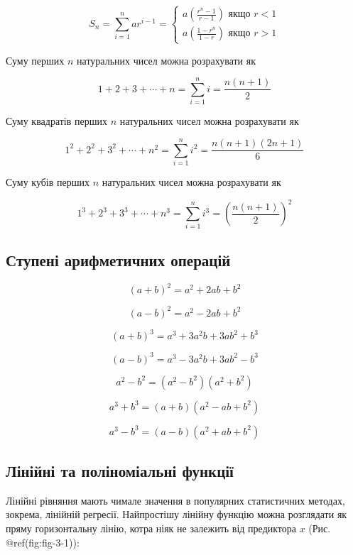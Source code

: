 \documentclass[
  11pt,
]{book}
\begin{document}
\[S_n = \sum\limits_{i=1}^n ar^{i-1} = \begin{cases}
a \left( \frac{r^n - 1}{r-1} \right) \text{ якщо } r<1 \\
a \left( \frac{1-r^n}{1-r} \right) \text{ якщо } r>1
\end{cases}\]

Суму перших \(n\) натуральних чисел можна розрахувати як

\[1+2+3+\cdots + n = \sum\limits_{i=1}^n i = \frac{n(n+1)}{2}\]

Суму квадратів перших \(n\) натуральних чисел можна розрахувати як

\[1^2+2^2+3^2+\cdots + n^2 = \sum\limits_{i=1}^n i^2 = \frac{n(n+1)(2n+1)}{6}\]

Суму кубів перших \(n\) натуральних чисел можна розрахувати як

\[1^3+2^3+3^3+\cdots + n^3 = \sum\limits_{i=1}^n i^3 = \left( \frac{n(n+1)}{2} \right)^2\]

\subsection{Ступені арифметичних
операцій}\label{ux441ux442ux443ux43fux435ux43dux456-ux430ux440ux438ux444ux43cux435ux442ux438ux447ux43dux438ux445-ux43eux43fux435ux440ux430ux446ux456ux439}

\[(a+b)^2 = a^2 + 2ab + b^2\]

\[(a-b)^2 = a^2 - 2ab + b^2\]

\[(a+b)^3 = a^3 + 3a^2b + 3ab^2 + b^3\]

\[(a-b)^3 = a^3 - 3a^2b + 3ab^2 - b^3\]

\[a^2 - b^2 = (a^2 - b^2)(a^2 + b^2)\]

\[a^3 + b^3 = (a+b)(a^2 - ab + b^2)\]

\[a^3 - b^3 = (a-b)(a^2 + ab + b^2)\]

\subsection{Лінійні та поліноміальні
функції}\label{ux43bux456ux43dux456ux439ux43dux456-ux442ux430-ux43fux43eux43bux456ux43dux43eux43cux456ux430ux43bux44cux43dux456-ux444ux443ux43dux43aux446ux456ux457}

Лінійні рівняння мають чимале значення в популярних статистичних
методах, зокрема, лінійній регресії. Найпростішу лінійну функцію можна
розглядати як пряму горизонтальну лінію, котра ніяк не залежить від
предиктора \(x\) (Рис. @ref(fig:fig-3-1)):
\end{document}
